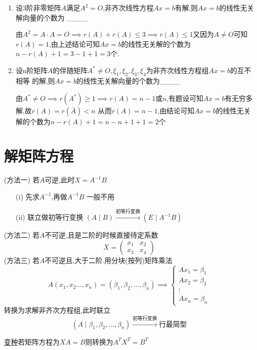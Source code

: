 \documentclass[12pt, a4paper, oneside, UTF8]{ctexbook}
\begin{document}
\begin{enumerate}
    \item 设3阶非零矩阵$A$满足$A^2=O$,非齐次线性方程$Ax=b$有解,则$Ax=b$的线性无关解向量的个数为
    \_\_\_\_ 

    \begin{solution}
        由$A^2 = A\cdot A = O \implies r(A) + r(A) \leq 3 \implies r(A)\leq 1$又因为$A\neq O$可知 
        $r(A) = 1$,由上述结论可知$Ax=b$的线性无关解的个数为$n-r(A)+1 = 3 - 1 + 1 = 3$个. 
    \end{solution} 

    \item 设n阶矩阵$A$的伴随矩阵$A^*\neq O,\xi_1,\xi_2,\xi_3,\xi_4$为非齐次线性方程组$Ax=b$的互不相等
    的解,则$Ax=b$的线性无关解向量的个数为\_\_\_\_  

    \begin{solution}
        由$A^*\neq O \implies r(A^*)\geq 1 \implies r(A) = n-1\text{或} n$,有题设可知$Ax=b$有无穷多解,故$r(A)=r(\bar{A})<n$
        从而$r(A)=n-1$,由结论可知$Ax=b$的线性无关解的个数为$n-r(A)+1 = n - n + 1 + 1 = 2$个
    \end{solution}
\end{enumerate}

\section{解矩阵方程}
\begin{remark}[解$Ax=B$三种方法]
    (方法一) 若$A$可逆,此时$X=A^{-1}B$ 
    \begin{enumerate}
        \item [(i)] 先求$A^{-1}$,再做$A^{-1}B$ 一般不用 
        \item [(ii)] 联立做初等行变换 $(A\mid B)\xrightarrow{\text{初等行变换}}(E\mid A^{-1}B)$
    \end{enumerate}
    (方法二) 若$A$不可逆,且是二阶的时候直接待定系数 
    $$
    X=\begin{pmatrix}
        x_1 & x_2 \\
        x_3 & x_4 
    \end{pmatrix}
    $$
    (方法三) 若$A$不可逆且,大于二阶.用分块(按列)矩阵乘法  
    $$
    A(x_1,x_2\ldots,x_n)=(\beta_1,\beta_2,\ldots,\beta_n) \implies \begin{cases}
        Ax_1 = \beta_1 \\
        Ax_2 = \beta_2 \\
        \vdots \\
        Ax_n = \beta_n 
    \end{cases}
    $$
    转换为求解非齐次方程组,此时联立 
    $$
    (A\mid \beta_1,\beta_2,\ldots,\beta_n) \xrightarrow{\text{初等行变换}}\text{行最简型}
    $$
\end{remark}
\underline{变种}若矩阵方程为$XA=B$则转换为$A^TX^T=B^T$
\end{document}

